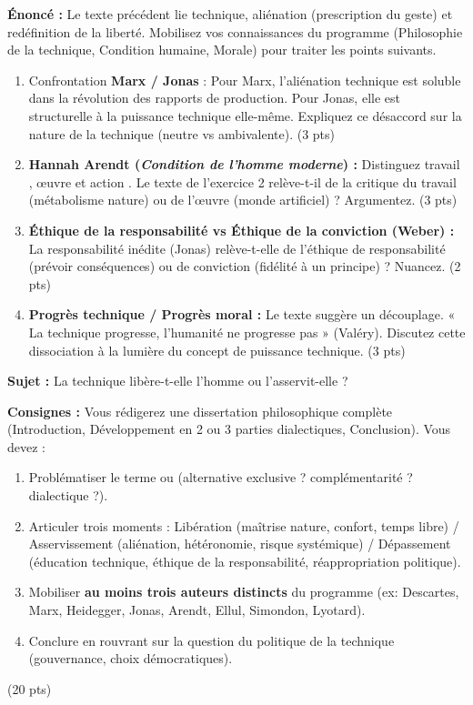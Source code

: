 \documentclass[11pt]{article}
\begin{document}
\begin{exercice}
\textbf{Énoncé :} Le texte précédent lie technique, aliénation (prescription du geste) et redéfinition de la liberté. Mobilisez vos connaissances du programme (Philosophie de la technique, Condition humaine, Morale) pour traiter les points suivants.
\begin{enumerate}
    \item Confrontation \textbf{Marx / Jonas} : Pour Marx, l'aliénation technique est soluble dans la révolution des rapports de production. Pour Jonas, elle est structurelle à la puissance technique elle-même. Expliquez ce désaccord sur la nature de la technique (neutre vs ambivalente). \hfill (3 pts)
    \item \textbf{Hannah Arendt (\textit{Condition de l'homme moderne}) :} Distinguez \og travail \fg{}, \og œuvre \fg{} et \og action \fg{}. Le texte de l'exercice 2 relève-t-il de la critique du \og travail \fg{} (métabolisme nature) ou de l'\og œuvre \fg{} (monde artificiel) ? Argumentez. \hfill (3 pts)
    \item \textbf{Éthique de la responsabilité vs Éthique de la conviction (Weber) :} La \og responsabilité inédite \fg{} (Jonas) relève-t-elle de l'éthique de responsabilité (prévoir conséquences) ou de conviction (fidélité à un principe) ? Nuancez. \hfill (2 pts)
    \item \textbf{Progrès technique / Progrès moral :} Le texte suggère un découplage. « La technique progresse, l'humanité ne progresse pas » (Valéry). Discutez cette dissociation à la lumière du concept de \og puissance \fg{} technique. \hfill (3 pts)
\end{enumerate}
\end{exercice}

\begin{exercice}
\textbf{Sujet :} \og La technique libère-t-elle l'homme ou l'asservit-elle ? \fg{}

\textbf{Consignes :} Vous rédigerez une dissertation philosophique complète (Introduction, Développement en 2 ou 3 parties dialectiques, Conclusion). Vous devez :
\begin{enumerate}
    \item Problématiser le terme \og ou \fg{} (alternative exclusive ? complémentarité ? dialectique ?).
    \item Articuler trois moments : Libération (maîtrise nature, confort, temps libre) / Asservissement (aliénation, hétéronomie, risque systémique) / Dépassement (éducation technique, éthique de la responsabilité, réappropriation politique).
    \item Mobiliser \textbf{au moins trois auteurs distincts} du programme (ex: Descartes, Marx, Heidegger, Jonas, Arendt, Ellul, Simondon, Lyotard).
    \item Conclure en rouvrant sur la question du \og politique \fg{} de la technique (gouvernance, choix démocratiques).
\end{enumerate}
\hfill (20 pts)
\end{exercice}
\end{document}
